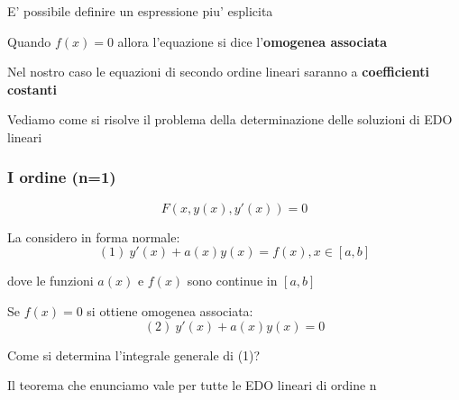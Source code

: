 \documentclass[11pt]{article}
\begin{document}
E' possibile definire un espressione piu' esplicita




Quando $f(x)=0$ allora l'equazione si dice l'\textbf{omogenea associata} 


Nel nostro caso le equazioni di secondo ordine lineari saranno a \textbf{coefficienti costanti}


Vediamo come si risolve il problema della determinazione delle soluzioni di EDO lineari


\subsubsection{I ordine (n=1)}

\[
    F(x,y(x),y'(x))=0
\]

La considero in forma normale:
\[
    (1)\ y'(x)+a(x)y(x)=f(x), x \in [a,b]
\]

dove le funzioni $a(x)$ e $f(x)$ sono continue in $[a,b]$


Se $f(x)=0$ si ottiene omogenea associata:
\[
    (2)\ y'(x)+a(x)y(x)=0
\]

Come si determina l'integrale generale di (1)?

Il teorema che enunciamo vale per tutte le EDO lineari di ordine n

\end{document}
